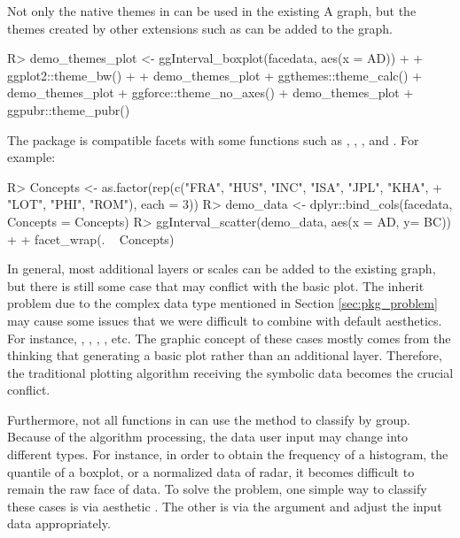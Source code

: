 \documentclass[article]{jss}
\begin{document}
Not only the native themes in  can be used in the existing A graph, but the themes created by other  extensions such as  can be added to the graph.
\begin{CodeChunk}
\begin{CodeInput}
R> demo_themes_plot <- ggInterval_boxplot(facedata, aes(x = AD)) +
+      ggplot2::theme_bw()
+
+  demo_themes_plot + ggthemes::theme_calc()
+  demo_themes_plot + ggforce::theme_no_axes()
+  demo_themes_plot + ggpubr::theme_pubr()
\end{CodeInput}
\end{CodeChunk}

The  package is compatible  facets with some functions such as , , , and . For example:
\begin{CodeChunk}
\begin{CodeInput}
R> Concepts <- as.factor(rep(c("FRA", "HUS", "INC", "ISA", "JPL", "KHA",
+                             "LOT", "PHI", "ROM"), each = 3))
R> demo_data <- dplyr::bind_cols(facedata, Concepts = Concepts)
R> ggInterval_scatter(demo_data, aes(x = AD, y= BC)) + 
+      facet_wrap(. ~ Concepts)
\end{CodeInput}
\end{CodeChunk}

In general, most additional layers or scales can be added to the existing  graph, but there is still some case that may conflict with the basic plot. The inherit problem due to the complex data type mentioned in Section \ref{sec:pkg_problem} may cause some issues that we were difficult to combine with default aesthetics. For instance, , ,  , , etc. The graphic concept of these cases mostly comes from the thinking that generating a basic plot rather than an additional layer. Therefore, the traditional plotting algorithm receiving the symbolic data becomes the crucial conflict.


Furthermore, not all functions in  can use the method to classify by group. Because of the algorithm processing, the data user input may change into different types. For instance, in order to obtain the frequency of a histogram, the quantile of a boxplot, or a normalized data of radar, it becomes difficult to remain the raw face of data. To solve the problem, one simple way to classify these cases is via aesthetic . The other is via the  argument and adjust the input data appropriately.
\end{document}
